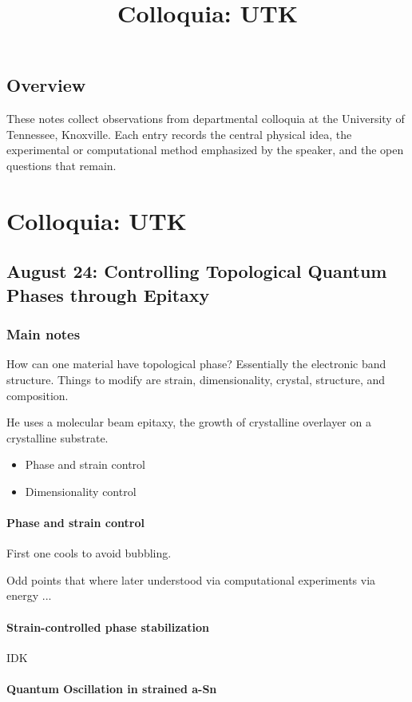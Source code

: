 \title{Colloquia: UTK}

\section{Overview}
These notes collect observations from departmental colloquia at the University of Tennessee, Knoxville. Each entry records the central physical idea, the experimental or computational method emphasized by the speaker, and the open questions that remain.

\chapter{Colloquia: UTK}

\section{August 24: Controlling Topological Quantum Phases through Epitaxy}

\subsection{Main notes}
How can one material have topological phase? Essentially the electronic band structure. Things to modify are strain, dimensionality, crystal, structure, and composition.

He uses a molecular beam epitaxy, the growth of crystalline overlayer on a crystalline substrate.
\begin{itemize}
	\item Phase and strain control
  \item Dimensionality control
\end{itemize}
\subsubsection{Phase and strain control}

First one cools to avoid bubbling.

Odd points that where later understood via computational experiments via energy ...
\subsubsection{Strain-controlled phase stabilization}
IDK

\subsubsection{Quantum Oscillation in strained a-Sn}

